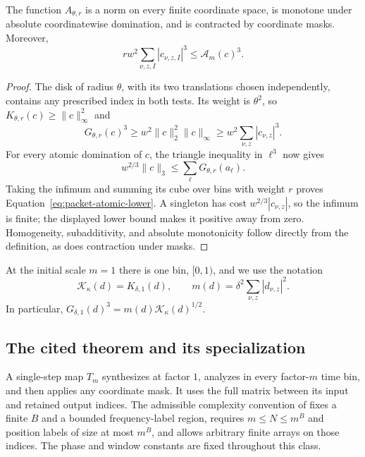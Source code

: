 \begin{lemma}
\label{lem:packet-atomic}
The function $A_{\theta,r}$ is a norm on every finite coordinate
space, is monotone under absolute coordinatewise domination, and
is contracted by coordinate masks.  Moreover,
\begin{equation}\label{eq:packet-atomic-lower}
 rw^2\sum_{\nu,z,I}|c_{\nu,z,I}|^3\le\mathcal A_m(c)^3.
\end{equation}
\end{lemma}

\begin{proof}
The disk of radius $\theta$, with its two translations chosen
independently, contains any prescribed index in both tests.
Its weight is $\theta^2$, so
$K_{\theta,r}(c)\ge\|c\|_\infty^2$ and
\[
 G_{\theta,r}(c)^3
 \ge w^2\|c\|_2^2\|c\|_\infty
 \ge w^2\sum_{\nu,z}|c_{\nu,z}|^3.
\]
For every atomic domination of $c$, the triangle inequality in
$\ell^3$ now gives
\[
 w^{2/3}\|c\|_3\le\sum_\ell G_{\theta,r}(a_\ell).
\]
Taking the infimum and summing its cube over bins with weight $r$
proves Equation~\eqref{eq:packet-atomic-lower}.  A singleton has
cost $w^{2/3}|c_{\nu,z}|$, so the infimum is finite; the displayed
lower bound makes it positive away from zero.  Homogeneity,
subadditivity, and absolute monotonicity follow directly from the
definition, as does contraction under masks.
\end{proof}

At the initial scale $m=1$ there is one bin, $[0,1)$, and we use
the notation
\begin{equation}\label{eq:packet-capacity}
 \mathcal K_\kappa(d)=K_{\delta,1}(d),
 \qquad
 m(d)=\delta^2\sum_{\nu,z}|d_{\nu,z}|^2.
\end{equation}
In particular,
$G_{\delta,1}(d)^3=m(d)\mathcal K_\kappa(d)^{1/2}$.

\subsection{The cited theorem and its specialization}

A single-step map $T_m$ synthesizes at factor $1$, analyzes in
every factor-$m$ time bin, and then applies any coordinate mask.
It uses the full matrix between its input and retained output
indices.  The admissible complexity convention of
\cite[Definition~\PacketFamilyDefinition]{OpenAIPacket2026} fixes a finite $B$
and a bounded frequency-label region, requires
$m\le N\le m^B$ and position labels of size at most $m^B$, and
allows arbitrary finite arrays on those indices.  The phase and
window constants are fixed throughout this class.

